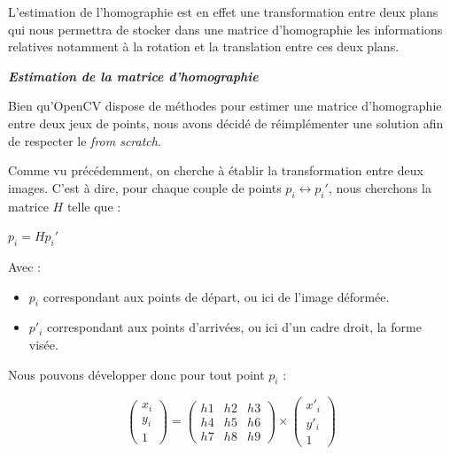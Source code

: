        L'estimation de l'homographie est en effet une transformation entre deux plans qui nous permettra de stocker dans une matrice d'homographie les informations relatives notamment à la rotation et la translation entre ces deux plans.

        \textbf{\textit{Estimation de la matrice d'homographie}}

        Bien qu'OpenCV dispose de méthodes pour estimer une matrice d'homographie entre deux jeux de points, nous avons décidé de réimplémenter une solution afin de respecter le \emph{from scratch}.

        Comme vu précédemment, on cherche à établir la transformation entre deux images. C'est à dire, pour chaque couple de points $p_i \leftrightarrow p_{i}' $, nous cherchons la matrice $H$ telle que :
    
        \begin{center}
            $ p_i = Hp_i' $            
        \end{center}

        Avec :

        \begin{itemize}
            \item $ p_i $ correspondant aux points de départ, ou ici de l'image déformée.
            \item $ p'_i $ correspondant aux points d'arrivées, ou ici d'un cadre droit, la forme visée.
        \end{itemize}
            
        Nous pouvons développer donc pour tout point $p_i$ :
    
        \[
            \begin{pmatrix}
                x_i \\
                y_i \\
                1      
            \end{pmatrix}
            = 
            \begin{pmatrix}
                h1 & h2 & h3 \\
                h4 & h5 & h6 \\
                h7 & h8 & h9      
            \end{pmatrix} 
            \times
            \begin{pmatrix}
                x'_i \\
                y'_i \\
                1      
            \end{pmatrix}
            \]
        
